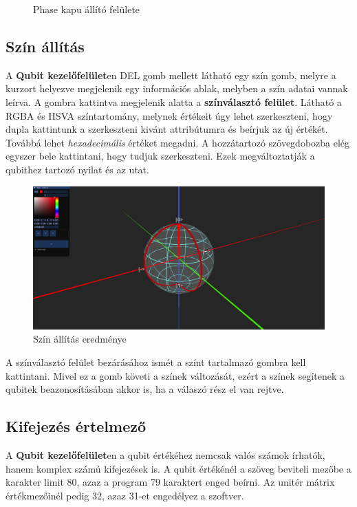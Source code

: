 \documentclass[fontsize=12pt,a4paper]{article}
\begin{document}
\begin{figure}[h]
\begin{minipage}{0.3\linewidth}
        \caption{Phase kapu állító felülete}
    \end{minipage}
\end{figure}

\newpage
\subsection{Szín állítás}
A \textbf{Qubit kezelőfelület}en DEL gomb mellett látható egy szín gomb, melyre a kurzort helyezve megjelenik egy információs ablak, melyben a szín adatai vannak leírva. A gombra kattintva megjelenik alatta a \textbf{színválasztó felület}. Látható a RGBA és HSVA színtartomány, melynek értékeit úgy lehet szerkeszteni, hogy dupla kattintunk a szerkeszteni kivánt attribútumra és beírjuk az új értékét. Továbbá lehet \textit{hexadecimális} értéket megadni. A hozzátartozó szövegdobozba elég egyszer bele kattintani, hogy tudjuk szerkeszteni. Ezek megváltoztatják a qubithez tartozó nyilat és az utat.

\begin{figure}[h]
    \centering
    \includegraphics[width=1.0\linewidth]{App/color.png}
    \caption{Szín állítás eredménye}
\end{figure}

A színválasztó felület bezárásához ismét a színt tartalmazó gombra kell kattintani. Mivel ez a gomb követi a színek változását, ezért a színek segítenek a qubitek beazonosításában akkor is, ha a válaszó rész el van rejtve.


\newpage
\subsection{Kifejezés értelmező}
A \textbf{Qubit kezelőfelület}en a qubit értékéhez nemcsak valós számok írhatók, hanem komplex számú kifejezések is. A qubit értékénél a szöveg beviteli mezőbe a karakter limit 80, azaz a program 79 karaktert enged beírni. Az unitér mátrix értékmezőinél pedig 32, azaz 31-et engedélyez a szoftver.
\end{document}
